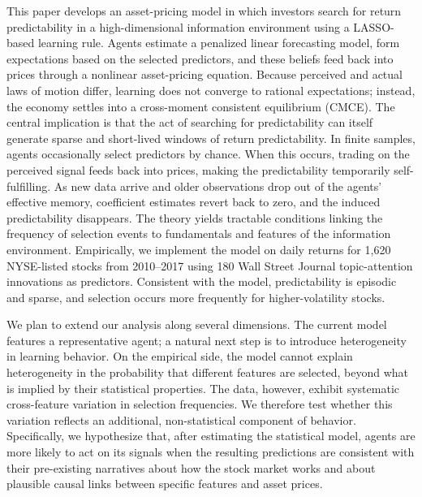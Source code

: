 \documentclass[11pt]{article}
\begin{document}
This paper develops an asset-pricing model in which investors search for return predictability in a high-dimensional information environment using a LASSO-based learning rule.
Agents estimate a penalized linear forecasting model, form expectations based on the selected predictors, and these beliefs feed back into prices through a nonlinear asset-pricing equation.
Because perceived and actual laws of motion differ, learning does not converge to rational expectations; instead, the economy settles into a cross-moment consistent equilibrium (CMCE).
The central implication is that the act of searching for predictability can itself generate sparse and short-lived windows of return predictability.
In finite samples, agents occasionally select predictors by chance.
When this occurs, trading on the perceived signal feeds back into prices, making the predictability temporarily self-fulfilling.
As new data arrive and older observations drop out of the agents’ effective memory, coefficient estimates revert back to zero, and the induced predictability disappears.
The theory yields tractable conditions linking the frequency of selection events to fundamentals and features of the information environment.
Empirically, we implement the model on daily returns for 1{,}620 NYSE-listed stocks from 2010--2017 using 180 Wall Street Journal topic-attention innovations as predictors.
Consistent with the model, predictability is episodic and sparse, and selection occurs more frequently for higher-volatility stocks.


We plan to extend our analysis along several dimensions.
The current model features a representative agent; a natural next step is to introduce heterogeneity in learning behavior.
On the empirical side, the model cannot explain heterogeneity in the probability that different features are selected, beyond what is implied by their statistical properties. 
The data, however, exhibit systematic cross-feature variation in selection frequencies. We therefore test whether this variation reflects an additional, non-statistical component of behavior. 
Specifically, we hypothesize that, after estimating the statistical model, agents are more likely to act on its signals when the resulting predictions are consistent with their pre-existing narratives about how the stock market works and about plausible causal links between specific features and asset prices.




\newpage
\end{document}
